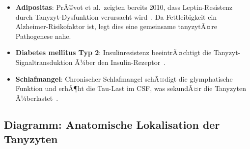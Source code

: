 ﻿\documentclass[12pt,a4paper]{article}
\theoremstyle{definition}
\begin{document}
	\begin{itemize}
		\item \textbf{Adipositas}: PrÃ©vot et al.\ zeigten bereits 2010, dass Leptin-Resistenz durch Tanyzyt-Dysfunktion verursacht wird~\cite{Prevot2010}. Da Fettleibigkeit ein Alzheimer-Risikofaktor ist, legt dies eine gemeinsame tanyzytÃ¤re Pathogenese nahe.
		\item \textbf{Diabetes mellitus Typ 2}: Insulinresistenz beeintrÃ¤chtigt die Tanyzyt-Signaltrans\-duktion Ã¼ber den Insulin-Rezeptor~\cite{Benner2018}.
		\item \textbf{Schlafmangel}: Chronischer Schlafmangel schÃ¤digt die glymphatische Funktion und erhÃ¶ht die Tau-Last im CSF, was sekundÃ¤r die Tanyzyten Ã¼berlastet~\cite{Xie2013}.
	\end{itemize}
	
	\subsection{Diagramm: Anatomische Lokalisation der Tanyzyten}
	
\end{document}
